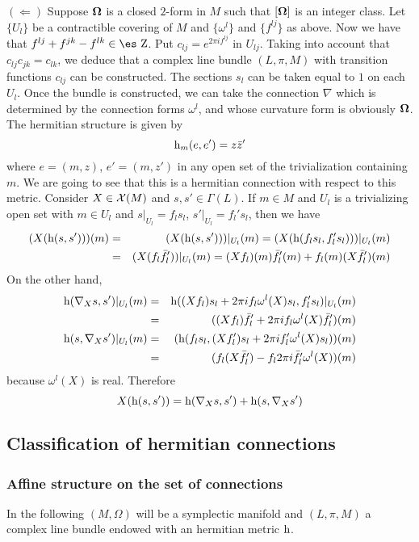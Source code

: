 \documentclass[12pt]{article}
\theoremstyle{plain}
\def\beann{\begin{eqnarray*}}
\def\eeann{\end{eqnarray*}}
\def\qed{\ifvmode\removelastskip\fi
{\unskip\nobreak\hfil\penalty50\hbox{}\nobreak\hfil
\hbox{\vrule height1.2ex width1.2ex}\parfillskip=0pt
\finalhyphendemerits=0 \par\smallskip}}
\def\h{{\rm h}}
\def\curv{{\bf \Omega}}
\def\Zahl{\mbox{\es Z}}
\begin{document}
\quad
$(\Longleftarrow)$ \quad
Suppose $\curv $ is a closed $2$-form in $M$ such that
$[\curv ]$ is an integer class.
Let $\{ U_l \}$ be a contractible covering of $M$
and  $\{ \omega^l  \}$ and $\{ f^{l j} \}$ as above.
Now we have that
$f^{l j} + f^{jk} - f^{l k} \in \Zahl$.
Put $c_{l j} = e^{2\pi i f^{l j}}$ in $U_{l j}$.
Taking into account that $c_{l j} c_{jk} = c_{l k}$,
we deduce that a complex line bundle
$(L,\pi ,M)$ with transition functions $c_{l j}$ can be constructed.
The sections $s_l$ can be taken equal to $1$ on each $U_l$.
Once the bundle is constructed, we can take the connection $\nabla$
which is determined by the connection forms
$\omega^l$, and whose curvature form is obviously $\curv $.
The hermitian structure is given by
$$
\h_m(e,e') = z \bar z'
$$
where $e = (m,z)$, $e' = (m,z')$
in any open set of the trivialization containing $m$.
We are going to see that this is
a hermitian connection with respect to this metric. Consider
$X \in {\cal X}(M)$ and $s,s' \in \Gamma (L)$. If
$m \in M$ and $U_l$ is a trivializing open set with $m \in U_l$ and
$s \vert_{U_l} = f_ls_l$, $s' \vert_{U_l} = f_l 's_l$, then we have
\beann
(X(\h (s,s')))(m)
&=&
(X(\h (s,s')))\vert_{U_l}(m)=
(X(\h (f_l s_l,f_l 's_l)))\vert_{U_l}(m)
\\
&=&
(X(f_l \bar f_l '))\vert_{U_l}(m)=
(Xf_l )(m) \bar f_l '(m) + f_l (m)(X \bar f_l ')(m)
\eeann
On the other hand,
\beann
\h (\nabla_X s,s')\vert_{U_l}(m)
&=&
\h ((Xf_l )s_l + 2 \pi i f_l\omega^l  (X)
 s_l ,f_l 's_l )\vert_{U_l}(m)\\ &=&
((Xf_l )\bar f_l ' + 2 \pi i f_l\omega^l  (X) \bar f_l ')(m)
\\
\h (s,\nabla_Xs')\vert_{U_l}(m)
&=&
(\h (f_l s_l ,(Xf_l ')s_l+ 2 \pi i f_l '\omega^l(X) s_l))(m)\\ &=&
(f_l (X \bar{f_l '}) -  f_l 2 \pi i \bar{f_l '}\omega^l  (X))(m)
\eeann
because $\omega^l  (X)$ is real. Therefore
$$
X(\h (s,s')) =
\h (\nabla_X s,s') + \h (s,\nabla_Xs')
$$
\qed



\subsection{Classification of hermitian connections}


\subsubsection{Affine structure on the set of connections}


In the following
$(M,\Omega)$ will be a symplectic manifold and
$(L,\pi , M)$ a complex line bundle
endowed with an hermitian metric $\h$.
\end{document}
